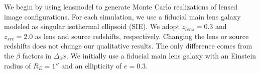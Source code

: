 We begin by using lensmodel to generate Monte Carlo realizations of lensed image configurations. For each simulation, we use a fiducial main lens galaxy modeled as singular isothermal ellipsoid (SIE). We adopt $z_{lens} = 0.3$ and $z_{src} = 2.0$ as lens and source redshifts, respectively. Changing the lens or source redshifts does not change our qualitative results. The only difference comes from the $\beta$ factors in $\Delta_3 x$. We initially use a fiducial main lens galaxy with an Einstein radius of $R_E = 1''$ and an ellipticity of $e =0.3$.
  